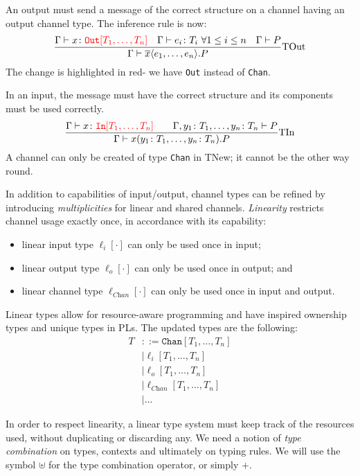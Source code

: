 \documentclass[a4paper, openany]{memoir}
\theoremstyle{definition}
\begin{document}
    An output must send a message of the correct structure on a channel having an output channel type. The inference rule is now:
    \[\frac{\Gamma \vdash x \colon {\color{red}\texttt{Out}[T_1, \dots, T_n]} \quad \Gamma \vdash e_i \colon T_i \ \forall 1 \leq i \leq n \quad \Gamma \vdash P}{\Gamma \vdash \overline{x} \langle e_1, \dots, e_n \rangle.P} \textrm{TOut}\]
    The change is highlighted in red- we have \texttt{Out} instead of \texttt{Chan}. 

    In an input, the message must have the correct structure and its components must be used correctly.
    \[\frac{\Gamma \vdash x \colon {\color{red}\texttt{In}[T_1, \dots, T_n]} \qquad \Gamma, y_1 \colon T_1, \dots, y_n \colon T_n \vdash P}{\Gamma \vdash x(y_1 \colon T_1, \dots, y_n \colon T_n).P} \textrm{TIn}\]
    A channel can only be created of type \texttt{Chan} in TNew; it cannot be the other way round.


    In addition to capabilities of input/output, channel types can be refined by introducing \emph{multiplicities} for linear and shared channels. \emph{Linearity} restricts channel usage exactly once, in accordance with its capability:
    \begin{itemize}
        \item linear input type $\ell_i[\cdot]$ can only be used once in input;
        \item linear output type $\ell_o[\cdot]$ can only be used once in output; and
        \item linear channel type $\ell_{\textit{Chan}}[\cdot]$ can only be used once in input and output.
    \end{itemize}
    Linear types allow for resource-aware programming and have inspired ownership types and unique types in PLs. The updated types are the following:
    \begin{align*}
        T &::= \texttt{Chan}[T_1, \dots, T_n] \\
        &\mid \ell_i[T_1, \dots, T_n] \\
        &\mid \ell_o[T_1, \dots, T_n] \\
        &\mid \ell_{\textit{Chan}}[T_1, \dots, T_n] \\
        &\mid \dots
    \end{align*}

    In order to respect linearity, a linear type system must keep track of the resources used, without duplicating or discarding any. We need a notion of \emph{type combination} on types, contexts and ultimately on typing rules. We will use the symbol $\uplus$ for the type combination operator, or simply $+$.
\end{document}
